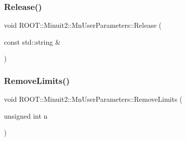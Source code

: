 \subsubsection{\texorpdfstring{Release()}{Release()}\hspace{0.1cm}{\footnotesize\ttfamily [6/6]}}
{\footnotesize\ttfamily void R\+O\+O\+T\+::\+Minuit2\+::\+Mn\+User\+Parameters\+::\+Release (\begin{DoxyParamCaption}\item[{const std\+::string \&}]{ }\end{DoxyParamCaption})}

\mbox{\label{classROOT_1_1Minuit2_1_1MnUserParameters_a399fd2fff4e1055c0878c8ce24205544}} 
\subsubsection{\texorpdfstring{RemoveLimits()}{RemoveLimits()}\hspace{0.1cm}{\footnotesize\ttfamily [1/6]}}
{\footnotesize\ttfamily void R\+O\+O\+T\+::\+Minuit2\+::\+Mn\+User\+Parameters\+::\+Remove\+Limits (\begin{DoxyParamCaption}\item[{unsigned int}]{n }\end{DoxyParamCaption})}


